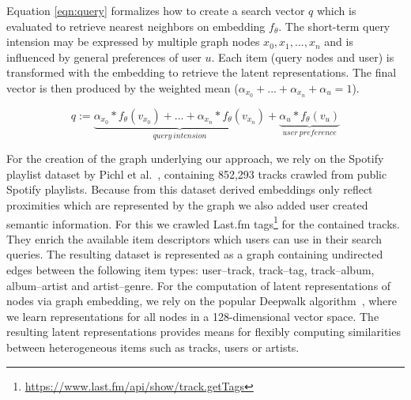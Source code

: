 \documentclass[sigconf]{acmart}
\begin{document}
Equation \ref{eqn:query} formalizes how to create a search vector $ q $ which is evaluated to retrieve nearest neighbors on embedding $ f_{\theta} $. The short-term query intension may be expressed by multiple graph nodes $ x_{0}, x_{1}, ..., x_{n} $ and is influenced by general preferences of user $ u $. Each item (query nodes and user) is transformed with the embedding to retrieve the latent representations. The final vector is then produced by the weighted mean ($ \alpha_{x_{0}} + ... + \alpha_{x_{n}} + \alpha_{u} = 1 $).
 

\begin{equation}
\tag{1}
q := 
\underbrace{
	\alpha_{x_{0}} * f_{\theta}(v_{x_{0}}) + ... + \alpha_{x_{n}} * f_{\theta}(v_{x_{n}})
}_{query \: intension} +
\underbrace{
	\alpha_{u} * f_{\theta}(v_{u})
}_{user \: preference}
\label{eqn:query}
\end{equation}

For the creation of the graph underlying our approach, we rely on the Spotify playlist dataset by Pichl et al.~\cite{pichl2017improving}, containing 852,293 tracks crawled from public Spotify playlists. Because from this dataset derived embeddings only reflect proximities which are represented by the graph we also added user created semantic information. For this we crawled Last.fm tags\footnote{\url{https://www.last.fm/api/show/track.getTags}} for the contained tracks. 
They enrich the available item descriptors which users can use in their search queries. The resulting dataset is represented as a graph containing undirected edges between the following item types: user--track, track--tag, track--album, album--artist and artist--genre. For the computation of latent representations of nodes via graph embedding, we rely on the popular Deepwalk algorithm~\cite{perozzi2014deepwalk}, where we learn representations for all nodes in a 128-dimensional vector space. The resulting latent representations provides means for flexibly computing similarities between heterogeneous items such as tracks, users or artists.


\end{document}
